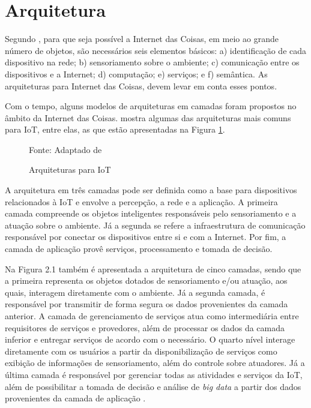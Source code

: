 \section{Arquitetura}

Segundo , para que seja possível a Internet das Coisas, em meio ao grande número de objetos, são necessários seis elementos básicos: a) identificação de cada dispositivo na rede; b) sensoriamento sobre o ambiente; c) comunicação entre os dispositivos e a Internet; d) computação; e) serviços; e f) semântica. As arquiteturas para Internet das Coisas, devem levar em conta esses pontos.

Com o tempo, alguns modelos de arquiteturas em camadas foram propostos no âmbito da Internet das Coisas.  mostra algumas das arquiteturas mais comuns para IoT, entre elas, as que estão apresentadas na Figura \ref{fig:cap2_arquiteturas}.

\begin{figure}[htb]
	\caption{Arquiteturas para IoT}

	\footnotesize{Fonte: Adaptado de }
	\label{fig:cap2_arquiteturas}
\end{figure}

A arquitetura em três camadas pode ser definida como a base para dispositivos relacionados à IoT e envolve a  percepção, a rede e a aplicação. A primeira camada compreende os objetos inteligentes responsáveis pelo sensoriamento e a atuação sobre o ambiente. Já a segunda se refere a infraestrutura de comunicação responsável por conectar os dispositivos entre si e com a Internet. Por fim, a camada de aplicação provê serviços, processamento e tomada de decisão.  


Na Figura 2.1 também é apresentada a arquitetura de cinco camadas, sendo que a primeira representa os objetos dotados de sensoriamento e/ou atuação, aos quais, interagem diretamente com o ambiente. Já a segunda camada, é responsável por transmitir de forma segura os dados provenientes da camada anterior. A camada de gerenciamento de serviços atua como intermediária entre requisitores de serviços e provedores, além de processar os dados da camada inferior e entregar  serviços de acordo com o necessário. O quarto nível interage diretamente com os usuários a partir da disponibilização de serviços como exibição de informações de sensoriamento, além do controle sobre atuadores. Já a última camada é responsável por gerenciar todas as atividades e serviços da IoT, além de possibilitar a tomada de decisão e análise de \textit{big data} a partir dos dados provenientes da camada de aplicação \cite{Al-Fuqaha2015}.

